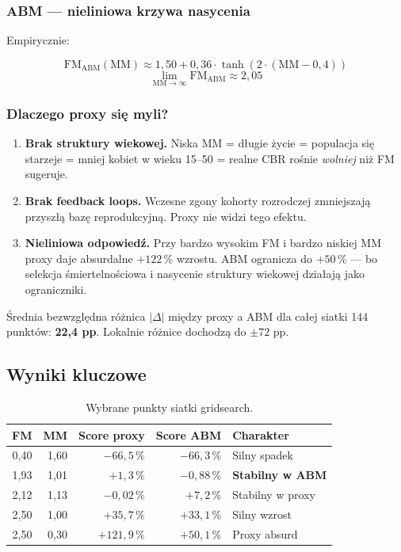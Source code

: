 \documentclass[11pt,a4paper]{article}
\begin{document}
\subsubsection{ABM --- nieliniowa krzywa nasycenia}

Empirycznie:
\begin{formulabox}
\[
\mathrm{FM}_{\text{ABM}}(\mathrm{MM}) \approx 1{,}50 + 0{,}36 \cdot \tanh(2 \cdot (\mathrm{MM} - 0{,}4))
\]
\[
\lim_{\mathrm{MM} \to \infty} \mathrm{FM}_{\text{ABM}} \approx 2{,}05
\]
\end{formulabox}

\subsubsection{Dlaczego proxy się myli?}

\begin{enumerate}[leftmargin=*]
  \item \textbf{Brak struktury wiekowej.} Niska MM = długie życie = populacja się starzeje = mniej kobiet w wieku 15--50 = realne CBR rośnie \emph{wolniej} niż FM sugeruje.
  \item \textbf{Brak feedback loops.} Wczesne zgony kohorty rozrodczej zmniejszają przyszłą bazę reprodukcyjną. Proxy nie widzi tego efektu.
  \item \textbf{Nieliniowa odpowiedź.} Przy bardzo wysokim FM i bardzo niskiej MM proxy daje absurdalne $+122\,\%$ wzrostu. ABM ogranicza do $+50\,\%$ --- bo selekcja śmiertelnościowa i nasycenie struktury wiekowej działają jako ograniczniki.
\end{enumerate}

Średnia bezwzględna różnica $|\Delta|$ między proxy a ABM dla całej siatki 144 punktów: \textbf{22{,}4 pp}. Lokalnie różnice dochodzą do $\pm 72$ pp.

\subsection{Wyniki kluczowe}

\begin{table}[h]
\centering
\small
\begin{tabular}{rrrrl}
\toprule
\textbf{FM} & \textbf{MM} & \textbf{Score proxy} & \textbf{Score ABM} & \textbf{Charakter} \\
\midrule
0{,}40 & 1{,}60 & $-66{,}5\,\%$ & $-66{,}3\,\%$ & Silny spadek \\
1{,}93 & 1{,}01 & $+1{,}3\,\%$  & $-0{,}88\,\%$ & \textbf{Stabilny w ABM} \\
2{,}12 & 1{,}13 & $-0{,}02\,\%$ & $+7{,}2\,\%$  & Stabilny w proxy \\
2{,}50 & 1{,}00 & $+35{,}7\,\%$ & $+33{,}1\,\%$ & Silny wzrost \\
2{,}50 & 0{,}30 & $+121{,}9\,\%$ & $+50{,}1\,\%$ & Proxy absurd \\
\bottomrule
\end{tabular}
\caption{Wybrane punkty siatki gridsearch.}
\end{table}
\end{document}
